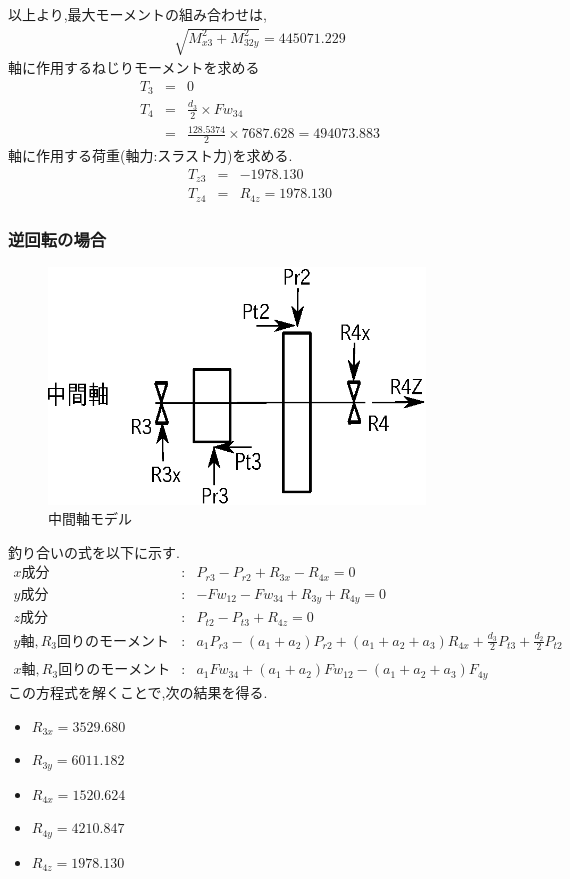 \documentclass[a4j,twoside,openright,11pt]{jreport}
\begin{document}
以上より,最大モーメントの組み合わせは,
\begin{eqnarray}
\sqrt{ M_{x3}^2 + M_{32y}^2 } = 445071.229
\end{eqnarray}
軸に作用するねじりモーメントを求める
\begin{eqnarray}
T_{3} &=& 0\\
T_{4} &=& \frac{d_3}{2} \times Fw_{34}\\
      &=& \frac{128.5374}{2} \times 7687.628 = 494073.883
\end{eqnarray}
軸に作用する荷重(軸力:スラスト力)を求める.
\begin{eqnarray}
T_{z3} &=& -1978.130\\
T_{z4} &=& R_{4z} = 1978.130
\end{eqnarray}
\subsubsection{逆回転の場合}
\begin{figure}[htbp]
\begin{center}
\includegraphics[width=10cm]{jiku43.eps}
\end{center}
\caption{中間軸モデル}
\end{figure}
釣り合いの式を以下に示す.
\begin{eqnarray}
x成分&:&P_{r3}-P_{r2}+R_{3x}-R_{4x}=0\\
y成分&:&-Fw_{12}-Fw_{34}+R_{3y}+R_{4y}=0\\
z成分&:&P_{t2}-P_{t3}+R_{4z}=0\\
y軸,R_3回りのモーメント&:&a_1P_{r3}-(a_1+a_2)P_{r2}+(a_1+a_2+a_3)R_{4x}+\frac{d_3}{2}P_{t3}+\frac{d_2}{2}P_{t2}\nonumber\\
\\
x軸,R_3回りのモーメント&:&a_1Fw_{34}+(a_1+a_2)Fw_{12}-(a_1+a_2+a_3)F_{4y}
\end{eqnarray}
この方程式を解くことで,次の結果を得る.
\begin{itemize}
\item $R_{3x} = 3529.680$
\item $R_{3y} = 6011.182$
\item $R_{4x} = 1520.624$
\item $R_{4y} = 4210.847$
\item $R_{4z} = 1978.130$
\end{itemize}
\end{document}

